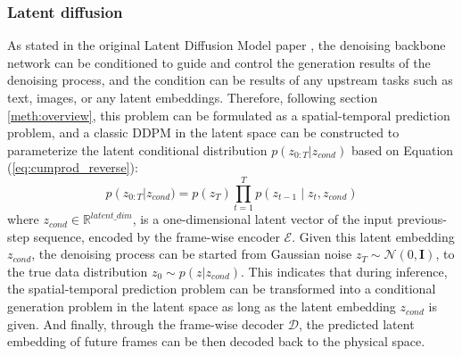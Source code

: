\documentclass[final-report]{article-template}
\begin{document}

\subsubsection{Latent diffusion}
As stated in the original Latent Diffusion Model paper \cite{rombach2022highresolution}, the denoising backbone network can be conditioned to guide and control the generation results of the denoising process, and the condition can be results of any upstream tasks such as text, images, or any latent embeddings. Therefore, following section \ref{meth:overview}, this problem can be formulated as a spatial-temporal prediction problem, and a classic DDPM in the latent space can be constructed to parameterize the latent conditional distribution $p(z_{0:T} | z_{cond})$ based on Equation (\ref{eq:cumprod_reverse}):
\begin{equation}
    p\left(z_{0: T}\right|z_{cond}) = p\left(z_T\right) \prod_{t=1}^T p\left(z_{t-1} \mid z_t, z_{cond}\right)
\end{equation}
where $z_{cond} \in \mathbb{R}^{latent\_dim}$, is a one-dimensional latent vector of the input previous-step sequence, encoded by the frame-wise encoder $\mathcal{E}$. Given this latent embedding $z_{cond}$, the denoising process can be started from Gaussian noise $z_T \sim \mathcal{N}(0, \mathbf{I})$, to the true data distribution $z_0 \sim p(z | z_{cond})$. This indicates that during inference, the spatial-temporal prediction problem can be transformed into a conditional generation problem in the latent space as long as the latent embedding $z_{cond}$ is given. And finally, through the frame-wise decoder $\mathcal{D}$, the predicted latent embedding of future frames can be then decoded back to the physical space. \\
\end{document}
